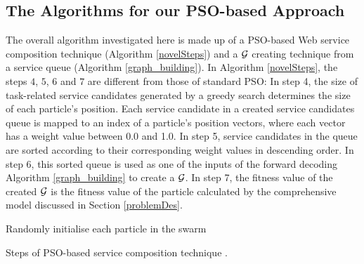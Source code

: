 \subsection{The Algorithms for our PSO-based Approach}\label{PSO-based_algomargin}
The overall algorithm investigated here is made up of a PSO-based Web service composition technique (Algorithm \ref{novelSteps}) and a $\mathcal{G}$ creating technique from a service queue (Algorithm \ref{graph_building}). In Algorithm \ref{novelSteps}, the  steps $4$, $5$, $6$ and $7$ are different from those of standard PSO: In step 4, the size of task-related service candidates generated by a greedy search determines the size of each particle's position. Each service candidate in a created service candidates queue is mapped to an index of a particle’s position vectors, where each vector has a weight value between 0.0 and 1.0. In step 5, service candidates in the queue are sorted according to their corresponding weight values in descending order. In step 6, this sorted queue is used as one of the inputs of the forward decoding Algorithm \ref{graph_building} to create a $\mathcal{G}$. In step 7, the fitness value of the created $\mathcal{G}$ is the fitness value of the particle calculated by the comprehensive model discussed in Section \ref{problemDes}.
\begin{algorithm}
 \SetNlSty{}{}{:}
 Randomly initialise each particle in the swarm\;
\caption{Steps of PSO-based service composition technique \cite{da2016particle}.}
\label{novelSteps}
\end{algorithm} 

